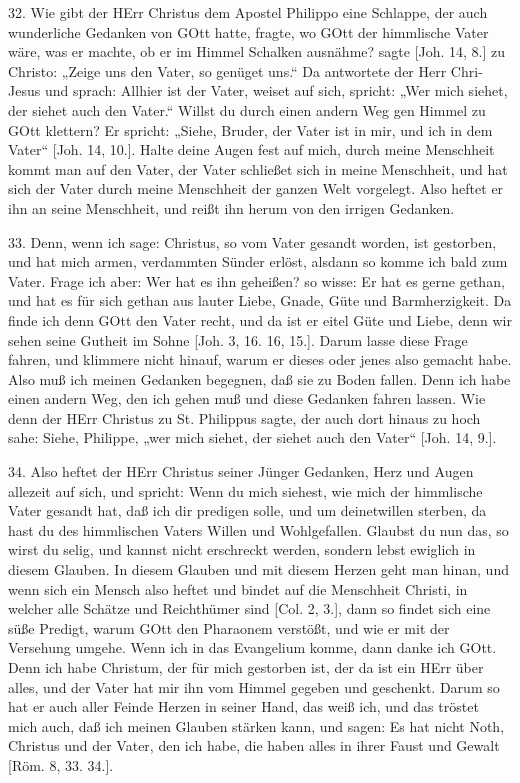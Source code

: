 32. Wie gibt der HErr Christus dem Apostel Philippo eine Schlappe, der auch wunderliche Gedanken von GOtt hatte, fragte, wo GOtt der himmlische Vater wäre, was er machte, ob er im Himmel Schalken ausnähme? sagte [Joh. 14, 8.] zu Christo: „Zeige uns den Vater, so genüget uns.“ Da antwortete der Herr Chri-
Jesus und sprach: Allhier ist der Vater, weiset auf sich, spricht: „Wer mich siehet, der siehet auch den Vater.“ Willst du durch einen andern Weg gen Himmel zu GOtt klettern? Er spricht: „Siehe, Bruder, der Vater ist in mir, und ich in dem Vater“ [Joh. 14, 10.]. Halte deine Augen fest auf mich, durch meine Menschheit kommt man auf den Vater, der Vater schließet sich in meine Menschheit, und hat sich der Vater durch meine Menschheit der ganzen Welt vorgelegt. Also heftet er ihn an seine Menschheit, und reißt ihn herum von den irrigen Gedanken.

33. Denn, wenn ich sage: Christus, so vom Vater gesandt worden, ist gestorben, und hat mich armen, verdammten Sünder erlöst, alsdann so komme ich bald zum Vater. Frage ich aber: Wer hat es ihn geheißen? so wisse: Er hat es gerne gethan, und hat es für sich gethan aus lauter Liebe, Gnade, Güte und Barmherzigkeit. Da finde ich denn GOtt den Vater recht, und da ist er eitel Güte und Liebe, denn wir sehen seine Gutheit im Sohne [Joh. 3, 16. 16, 15.]. Darum lasse diese Frage fahren, und klimmere nicht hinauf, warum er dieses oder jenes also gemacht habe. Also muß ich meinen Gedanken begegnen, daß sie zu Boden fallen. Denn ich habe einen andern Weg, den ich gehen muß und diese Gedanken fahren lassen. Wie denn der HErr Christus zu St. Philippus sagte, der auch dort hinaus zu hoch sahe: Siehe, Philippe, „wer mich siehet, der siehet auch den Vater“ [Joh. 14, 9.].

34. Also heftet der HErr Christus seiner Jünger Gedanken, Herz und Augen allezeit auf sich, und spricht: Wenn du mich siehest, wie mich der himmlische Vater gesandt hat, daß ich dir predigen solle, und um deinetwillen sterben, da hast du des himmlischen Vaters Willen und Wohlgefallen. Glaubst du nun das, so wirst du selig, und kannst nicht erschreckt werden, sondern lebst ewiglich in diesem Glauben. In diesem Glauben und mit diesem Herzen geht man hinan, und wenn sich ein Mensch also heftet und bindet auf die Menschheit Christi, in welcher alle Schätze und Reichthümer sind [Col. 2, 3.], dann so findet sich eine süße Predigt, warum GOtt den Pharaonem verstößt, und wie er mit der Versehung umgehe. Wenn ich in das Evangelium komme, dann danke ich GOtt. Denn ich habe Christum, der für mich gestorben ist, der da ist ein HErr über alles, und der Vater hat mir ihn vom Himmel gegeben und geschenkt. Darum so hat er auch aller Feinde Herzen in seiner Hand, das weiß ich, und das tröstet mich auch, daß ich meinen Glauben stärken kann, und sagen: Es hat nicht Noth, Christus und der Vater, den ich habe, die haben alles in ihrer Faust und Gewalt [Röm. 8, 33. 34.].

